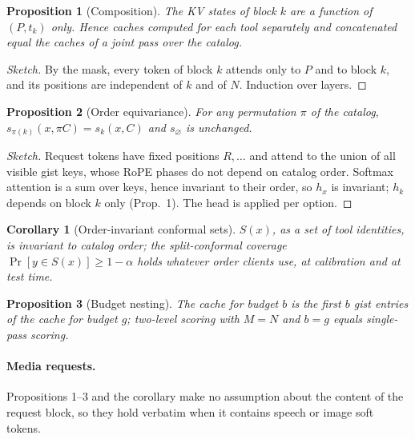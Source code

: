 \documentclass[sigconf,review,anonymous]{acmart}
\newtheorem{proposition}{Proposition}
\newtheorem{corollary}{Corollary}
\begin{document}
\begin{proposition}[Composition]
The KV states of block $k$ are a function of $(P, t_k)$ only. Hence caches computed for each tool separately and concatenated equal the caches of a joint pass over the catalog.
\end{proposition}
\begin{proof}[Sketch]
By the mask, every token of block $k$ attends only to $P$ and to block $k$, and its positions are independent of $k$ and of $N$. Induction over layers.
\end{proof}

\begin{proposition}[Order equivariance]
For any permutation $\pi$ of the catalog, $s_{\pi(k)}(x, \pi C) = s_k(x, C)$ and $s_\varnothing$ is unchanged.
\end{proposition}
\begin{proof}[Sketch]
Request tokens have fixed positions $R,\dots$ and attend to the union of all visible gist keys, whose RoPE phases do not depend on catalog order. Softmax attention is a sum over keys, hence invariant to their order, so $h_x$ is invariant; $h_k$ depends on block $k$ only (Prop.~1). The head is applied per option.
\end{proof}

\begin{corollary}[Order-invariant conformal sets]
$S(x)$, as a set of tool identities, is invariant to catalog order; the split-conformal coverage $\Pr[y\in S(x)]\ge 1-\alpha$ holds whatever order clients use, at calibration and at test time.
\end{corollary}

\begin{proposition}[Budget nesting]
The cache for budget $b$ is the first $b$ gist entries of the cache for budget $g$; two-level scoring with $M{=}N$ and $b{=}g$ equals single-pass scoring.
\end{proposition}

\paragraph{Media requests.} Propositions 1--3 and the corollary make no assumption about the content of the request block, so they hold verbatim when it contains speech or image soft tokens.
\end{document}
